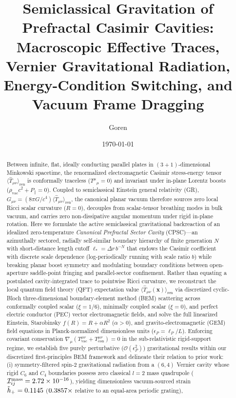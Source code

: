 \documentclass[aps,prd,twocolumn,10pt,showkeys,nofootinbib,floatfix,longbibliography]{revtex4-2}
\begin{document}
\title{Semiclassical Gravitation of Prefractal Casimir Cavities: Macroscopic Effective Traces, Vernier Gravitational Radiation, Energy-Condition Switching, and Vacuum Frame Dragging}

\author{Goren }

\date{\today}

\begin{abstract}
Between infinite, flat, ideally conducting parallel plates in $(3+1)$-dimensional Minkowski spacetime, the renormalized electromagnetic Casimir stress-energy tensor $\langle \hat{T}_{\mu\nu}\rangle_{\mathrm{ren}}$ is conformally traceless ($T^\mu{}_\mu = 0$) and invariant under in-plane Lorentz boosts ($\rho_{\mathrm{vac}}c^2 + P_\parallel = 0$). Coupled to semiclassical Einstein general relativity (GR), $G_{\mu\nu} = (8\pi G/c^4)\langle \hat{T}_{\mu\nu}\rangle_{\mathrm{ren}}$, the canonical planar vacuum therefore sources zero local Ricci scalar curvature ($R = 0$), decouples from scalar-tensor breathing modes in bulk vacuum, and carries zero non-dissipative angular momentum under rigid in-plane rotation. Here we formulate the active semiclassical gravitational backreaction of an idealized zero-temperature \emph{Canonical Prefractal Sector Cavity} (CPSC)---an azimuthally sectored, radially self-similar boundary hierarchy of finite generation $N$ with short-distance length cutoff $\ell_* = \Delta r\, b^{-N}$ that endows the Casimir coefficient with discrete scale dependence (log-periodically running with scale ratio $b$) while breaking planar boost symmetry and modulating boundary conditions between open-aperture saddle-point fringing and parallel-sector confinement. Rather than equating a postulated cavity-integrated trace to pointwise Ricci curvature, we reconstruct the local quantum field theory (QFT) expectation value $\langle \hat{T}_{\mu\nu}(\mathbf{x})\rangle_{\mathrm{ren}}$ via discretized cyclic-Bloch three-dimensional boundary-element method (BEM) scattering across conformally coupled scalar ($\xi = 1/6$), minimally coupled scalar ($\xi = 0$), and perfect electric conductor (PEC) vector electromagnetic fields, and solve the full linearized Einstein, Starobinsky $f(R) = R + \alpha R^2$ ($\alpha > 0$), and gravito-electromagnetic (GEM) field equations in Planck-normalized dimensionless units ($\epsilon_P = \ell_P / L$). Enforcing covariant conservation $\nabla_\mu(T^{\mu\nu}_{\mathrm{vac}} + T^{\mu\nu}_{\mathrm{con}}) = 0$ in the sub-relativistic rigid-support regime, we establish five purely perturbative ($\mathcal{O}(\epsilon_P^2)$) gravitational results within our discretized first-principles BEM framework and delineate their relation to prior work: (i) symmetry-filtered spin-2 gravitational radiation from a $(6,4)$ Vernier cavity whose rigid $C_6$ and $C_4$ boundaries possess zero classical $l=2$ mass quadrupole ($\mathcal{I}_{ij}^{\mathrm{mass}} = 2.72\times 10^{-16}$), yielding dimensionless vacuum-sourced strain $\tilde{h}_+ = 0.1145$ ($0.3857\times$ relative to an equal-area periodic grating), 
\end{abstract}
\end{document}
